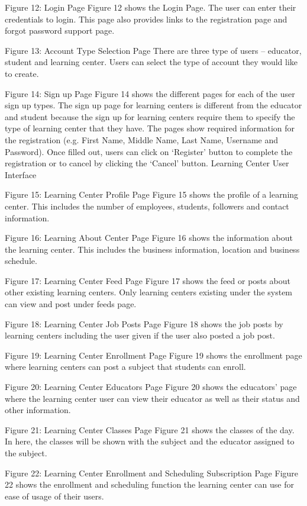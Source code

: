 Figure 12: Login Page
Figure 12 shows the Login Page. The user can enter their credentials to login. This page also provides links to the registration page and forgot password support page. 

 
Figure 13: Account Type Selection Page
There are three type of users – educator, student and learning center. Users can select the type of account they would like to create.
   
Figure 14: Sign up Page
Figure 14 shows the different pages for each of the user sign up types. The sign up page for learning centers is different from the educator and student because the sign up for learning centers require them to specify the type of learning center that they have. The pages show required information for the registration (e.g. First Name, Middle Name, Last Name, Username and Password). Once filled out, users can click on ‘Register’ button to complete the registration or to cancel by clicking the ‘Cancel’ button. 
Learning Center User Interface
 
Figure 15: Learning Center Profile Page 
Figure 15 shows the profile of a learning center. This includes the number of employees, students, followers and contact information.

 
Figure 16: Learning About Center Page
Figure 16 shows the information about the learning center. This includes the business information, location and business schedule.		
 
Figure 17: Learning Center Feed Page
Figure 17 shows the feed or posts about other existing learning centers. Only learning centers existing under the system can view and post under feeds page.
			 
Figure 18: Learning Center Job Posts Page 
Figure 18 shows the job posts by learning centers including the user given if the user also posted a job post. 
			 
Figure 19: Learning Center Enrollment Page 
Figure 19 shows the enrollment page where learning centers can post a subject that students can enroll.
 
Figure 20: Learning Center Educators Page 
Figure 20 shows the educators’ page where the learning center user can view their educator as well as their status and other information. 
  
Figure 21: Learning Center Classes Page 
Figure 21 shows the classes of the day. In here, the classes will be shown with the subject and the educator assigned to the subject.  

  
Figure 22: Learning Center Enrollment and Scheduling Subscription Page
Figure 22 shows the enrollment and scheduling function the learning center can use for ease of usage of their users. 
 

